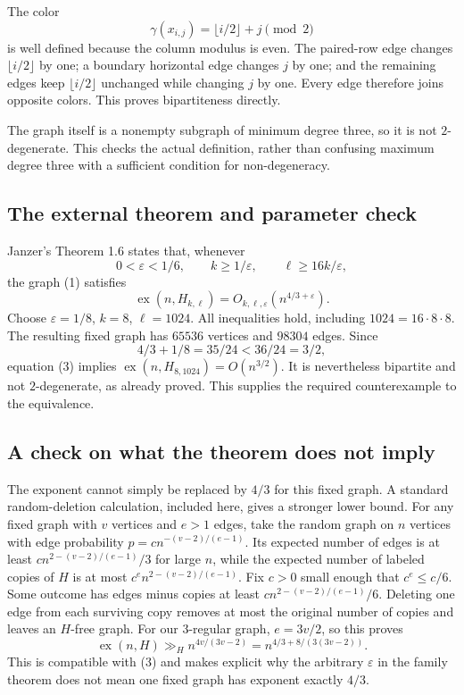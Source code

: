 The color
\[
\gamma(x_{i,j})=\lfloor i/2\rfloor+j\pmod2
\tag{2}
\]
is well defined because the column modulus is even. The paired-row edge changes $\lfloor i/2\rfloor$ by one; a boundary horizontal edge changes $j$ by one; and the remaining edges keep $\lfloor i/2\rfloor$ unchanged while changing $j$ by one. Every edge therefore joins opposite colors. This proves bipartiteness directly.

The graph itself is a nonempty subgraph of minimum degree three, so it is not $2$-degenerate. This checks the actual definition, rather than confusing maximum degree three with a sufficient condition for non-degeneracy.

\subsection{The external theorem and parameter check}
Janzer's Theorem 1.6 states that, whenever
\[
0<\varepsilon<1/6,\qquad k\geq1/\varepsilon,\qquad
\ell\geq16k/\varepsilon,
\]
the graph (1) satisfies
\[
\operatorname{ex}(n,H_{k,\ell})=O_{k,\ell,\varepsilon}(n^{4/3+\varepsilon}).
\tag{3}
\]
Choose $\varepsilon=1/8$, $k=8$, $\ell=1024$. All inequalities hold, including $1024=16\cdot8\cdot8$. The resulting fixed graph has $65536$ vertices and $98304$ edges. Since
\[
4/3+1/8=35/24<36/24=3/2,
\]
equation (3) implies $\operatorname{ex}(n,H_{8,1024})=O(n^{3/2})$. It is nevertheless bipartite and not $2$-degenerate, as already proved. This supplies the required counterexample to the equivalence.

\subsection{A check on what the theorem does not imply}
The exponent cannot simply be replaced by $4/3$ for this fixed graph. A standard random-deletion calculation, included here, gives a stronger lower bound. For any fixed graph with $v$ vertices and $e>1$ edges, take the random graph on $n$ vertices with edge probability $p=c n^{-(v-2)/(e-1)}$. Its expected number of edges is at least $c n^{2-(v-2)/(e-1)}/3$ for large $n$, while the expected number of labeled copies of $H$ is at most $c^e n^{2-(v-2)/(e-1)}$. Fix $c>0$ small enough that $c^e\leq c/6$. Some outcome has edges minus copies at least $c n^{2-(v-2)/(e-1)}/6$. Deleting one edge from each surviving copy removes at most the original number of copies and leaves an $H$-free graph. For our $3$-regular graph, $e=3v/2$, so this proves
\[
\operatorname{ex}(n,H)\gg_H n^{4v/(3v-2)}
=n^{4/3+8/(3(3v-2))}.
\]
This is compatible with (3) and makes explicit why the arbitrary $\varepsilon$ in the family theorem does not mean one fixed graph has exponent exactly $4/3$.

